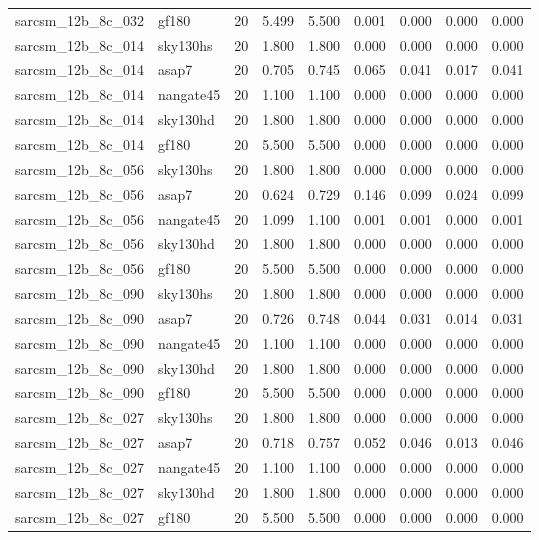 \begin{tabular}{llrrrrrrr}
sarcsm\_12b\_8c\_032 & gf180 & 20 & 5.499 & 5.500 & 0.001 & 0.000 & 0.000 & 0.000 \\
sarcsm\_12b\_8c\_014 & sky130hs & 20 & 1.800 & 1.800 & 0.000 & 0.000 & 0.000 & 0.000 \\
sarcsm\_12b\_8c\_014 & asap7 & 20 & 0.705 & 0.745 & 0.065 & 0.041 & 0.017 & 0.041 \\
sarcsm\_12b\_8c\_014 & nangate45 & 20 & 1.100 & 1.100 & 0.000 & 0.000 & 0.000 & 0.000 \\
sarcsm\_12b\_8c\_014 & sky130hd & 20 & 1.800 & 1.800 & 0.000 & 0.000 & 0.000 & 0.000 \\
sarcsm\_12b\_8c\_014 & gf180 & 20 & 5.500 & 5.500 & 0.000 & 0.000 & 0.000 & 0.000 \\
sarcsm\_12b\_8c\_056 & sky130hs & 20 & 1.800 & 1.800 & 0.000 & 0.000 & 0.000 & 0.000 \\
sarcsm\_12b\_8c\_056 & asap7 & 20 & 0.624 & 0.729 & 0.146 & 0.099 & 0.024 & 0.099 \\
sarcsm\_12b\_8c\_056 & nangate45 & 20 & 1.099 & 1.100 & 0.001 & 0.001 & 0.000 & 0.001 \\
sarcsm\_12b\_8c\_056 & sky130hd & 20 & 1.800 & 1.800 & 0.000 & 0.000 & 0.000 & 0.000 \\
sarcsm\_12b\_8c\_056 & gf180 & 20 & 5.500 & 5.500 & 0.000 & 0.000 & 0.000 & 0.000 \\
sarcsm\_12b\_8c\_090 & sky130hs & 20 & 1.800 & 1.800 & 0.000 & 0.000 & 0.000 & 0.000 \\
sarcsm\_12b\_8c\_090 & asap7 & 20 & 0.726 & 0.748 & 0.044 & 0.031 & 0.014 & 0.031 \\
sarcsm\_12b\_8c\_090 & nangate45 & 20 & 1.100 & 1.100 & 0.000 & 0.000 & 0.000 & 0.000 \\
sarcsm\_12b\_8c\_090 & sky130hd & 20 & 1.800 & 1.800 & 0.000 & 0.000 & 0.000 & 0.000 \\
sarcsm\_12b\_8c\_090 & gf180 & 20 & 5.500 & 5.500 & 0.000 & 0.000 & 0.000 & 0.000 \\
sarcsm\_12b\_8c\_027 & sky130hs & 20 & 1.800 & 1.800 & 0.000 & 0.000 & 0.000 & 0.000 \\
sarcsm\_12b\_8c\_027 & asap7 & 20 & 0.718 & 0.757 & 0.052 & 0.046 & 0.013 & 0.046 \\
sarcsm\_12b\_8c\_027 & nangate45 & 20 & 1.100 & 1.100 & 0.000 & 0.000 & 0.000 & 0.000 \\
sarcsm\_12b\_8c\_027 & sky130hd & 20 & 1.800 & 1.800 & 0.000 & 0.000 & 0.000 & 0.000 \\
sarcsm\_12b\_8c\_027 & gf180 & 20 & 5.500 & 5.500 & 0.000 & 0.000 & 0.000 & 0.000 \\

\end{tabular}
